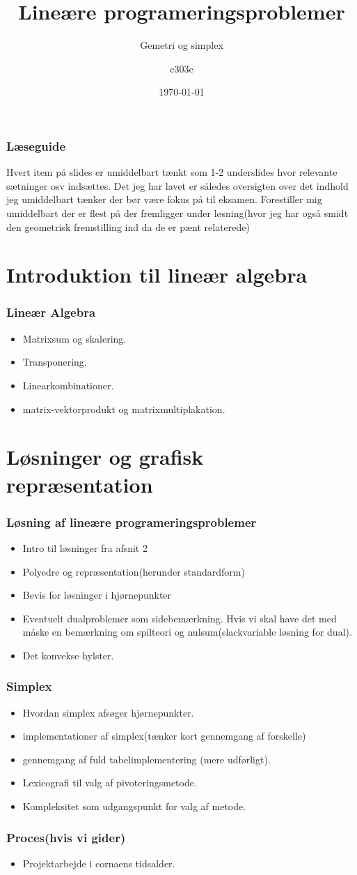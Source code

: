 \documentclass{beamer}
\title{Lineære programeringsproblemer}
\subtitle{Gemetri og simplex}
\author{c303c}
\institute{Aalborg Universitet}
\date{\today}
\begin{document}
\begin{frame}
\frametitle{Læseguide}
Hvert item på slides er umiddelbart tænkt som 1-2 underslides hvor relevante sætninger osv indsættes.
Det jeg har lavet er således oversigten over det indhold jeg umiddelbart tænker der bør være fokus på til eksamen.
Forestiller mig umiddelbart der er flest på der fremligger under løsning(hvor jeg har også smidt den geometrisk fremstilling ind da de er pænt relaterede)
\end{frame}

\section{Introduktion til lineær algebra}

\begin{frame}
\frametitle{Lineær Algebra}
\begin{itemize}
\item Matrixsum og skalering.
\item Transponering.
\item Linearkombinationer.
\item matrix-vektorprodukt og matrixmultiplakation.
\end{itemize}
\end{frame}

\section{Løsninger og grafisk repræsentation}

\begin{frame}
\frametitle{Løsning af lineære programeringsproblemer}
\begin{itemize}
\item Intro til løsninger fra afsnit 2
\item Polyedre og repræsentation(herunder standardform)
\item Bevis for løsninger i hjørnepunkter
\item Eventuelt dualproblemer som sidebemærkning. Hvis vi skal have det med måske en bemærkning om spilteori og nulsum(slackvariable løsning for dual).
\item Det konvekse hylster.
\end{itemize}
\end{frame}


\begin{frame}
\frametitle{Simplex}
\begin{itemize}
\item Hvordan simplex afsøger hjørnepunkter.
\item implementationer af simplex(tænker kort gennemgang af forskelle)
\item gennemgang af fuld tabelimplementering (mere udførligt).
\item Lexicografi til valg af pivoteringsmetode.
\item Kompleksitet som udgangspunkt for valg af metode.
\end{itemize}
\end{frame}


\begin{frame}
\frametitle{Proces(hvis vi gider)}
\begin{itemize}
\item Projektarbejde i cornaens tidsalder.
\end{itemize}
\end{frame}
\end{document}
